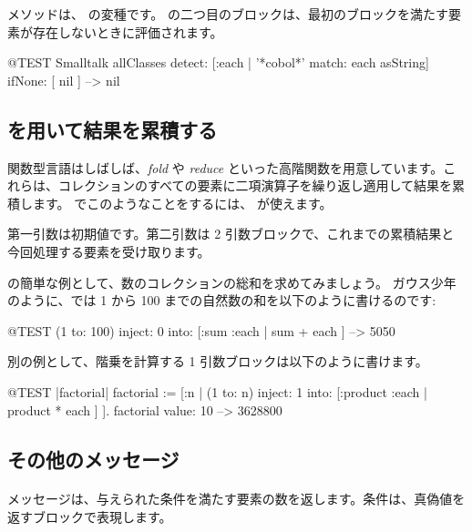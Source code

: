 \documentclass[a4paper,10pt,twoside]{book}
\begin{document}

 メソッドは、 の変種です。
 の二つ目のブロックは、最初のブロックを満たす要素が存在しないときに評価されます。

\begin{code}{@TEST}
Smalltalk allClasses detect: [:each | '*cobol*' match: each asString] ifNone: [ nil ] --> nil
\end{code}

\subsection{ を用いて結果を累積する}
関数型言語はしばしば、\emph{fold} や \emph{reduce} といった高階関数を用意しています。これらは、コレクションのすべての要素に二項演算子を繰り返し適用して結果を累積します。
\pharo でこのようなことをするには、 が使えます。

第一引数は初期値です。第二引数は 2 引数ブロックで、これまでの累積結果と今回処理する要素を受け取ります。

 の簡単な例として、数のコレクションの総和を求めてみましょう。
ガウス少年のように、\pharo では 1 から 100 までの自然数の和を以下のように書けるのです:
\begin{code}{@TEST}
(1 to: 100) inject: 0 into: [:sum :each | sum + each ] --> 5050
\end{code}

別の例として、階乗を計算する 1 引数ブロックは以下のように書けます。
\begin{code}{@TEST |factorial|}
factorial := [:n | (1 to: n) inject: 1 into: [:product :each | product * each ] ].
factorial value: 10 --> 3628800
\end{code}

\subsection{その他のメッセージ}

\paragraph{}  メッセージは、与えられた条件を満たす要素の数を返します。条件は、真偽値を返すブロックで表現します。
\end{document}
